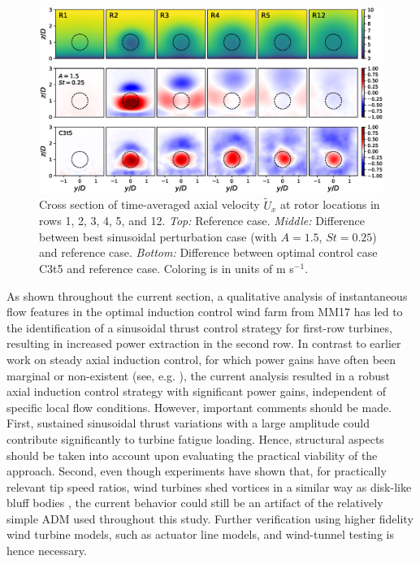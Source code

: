 \documentclass[wes, manuscript]{copernicus}
\begin{document}
\begin{figure}
	\centering
	\includegraphics[width=\textwidth]{frontviews_allc3t5.eps}
	\caption{Cross section of time-averaged axial velocity $\widetilde{U}_x$ at rotor locations in rows 1, 2, 3, 4, 5, and 12. \emph{Top: } Reference case. \emph{Middle: } Difference between best sinusoidal perturbation case (with $A = 1.5$, $St = 0.25$) and reference case. \emph{Bottom: } Difference between optimal control case C3t5 and reference case. Coloring is in units of m s$^{-1}$. \label{fig:cross_section_sinus}}
\end{figure}

As shown throughout the current section, a qualitative analysis of instantaneous flow features in the optimal induction control wind farm from MM17 has led to the identification of a sinusoidal thrust control strategy for first-row turbines, resulting in increased power extraction in the second row. In contrast to earlier work on steady axial induction control, for which power gains have often been marginal or non-existent (see, e.g. \citealp{annoni2016analysis}), the current analysis resulted in a robust axial induction control strategy with significant power gains, independent of specific local flow conditions. However, important comments should be made. First, sustained sinusoidal thrust variations with a large amplitude could contribute significantly to turbine fatigue loading. Hence, structural aspects should be taken into account upon evaluating the practical viability of the approach. Second, even though experiments have shown that, for practically relevant tip speed ratios, wind turbines shed vortices in a similar way as disk-like bluff bodies \citep{medici2006measurements}, the current behavior could still be an artifact of the relatively simple ADM used throughout this study. Further verification using higher fidelity wind turbine models, such as actuator line models, and wind-tunnel testing is hence necessary. 
\end{document}
